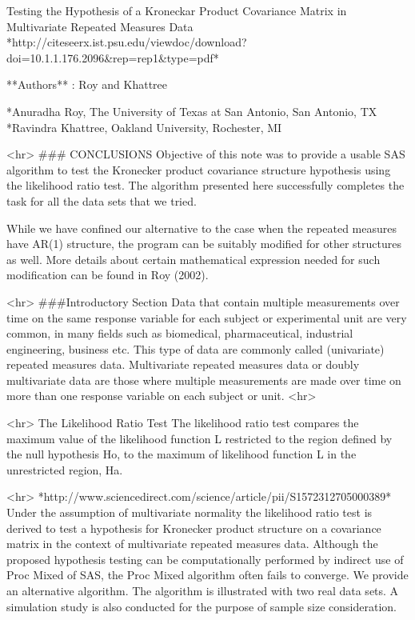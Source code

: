 Testing the Hypothesis of a Kroneckar Product Covariance Matrix in Multivariate Repeated Measures Data
*http://citeseerx.ist.psu.edu/viewdoc/download?doi=10.1.1.176.2096&rep=rep1&type=pdf*

**Authors** : Roy and Khattree

*Anuradha Roy, The University of Texas at San Antonio, San Antonio, TX  
*Ravindra Khattree, Oakland University, Rochester, MI  



<hr>
### CONCLUSIONS
Objective of this note was to provide a usable SAS algorithm to test the Kronecker product covariance
structure hypothesis using the likelihood ratio test. The algorithm presented here successfully completes
the task for all the data sets that we tried. 

While we have confined our alternative to the case when the repeated measures have AR(1) structure, the program can be suitably modified for other structures as well. More details about certain mathematical expression needed for such modification can be found in Roy (2002).

<hr>
###Introductory Section 
Data that contain multiple measurements over time on the same response variable for each subject
or experimental unit are very common, in many fields such as biomedical, pharmaceutical, industrial
engineering, business etc. This type of data are commonly called (univariate) repeated measures data.
Multivariate repeated measures data or doubly multivariate data are those where multiple measurements
are made over time on more than one response variable on each subject or unit.
<hr>

<hr>
The Likelihood Ratio Test
The likelihood ratio test compares the maximum value of the likelihood function L restricted to the
region defined by the null hypothesis Ho, to the maximum of likelihood function L in the unrestricted
region, Ha.

<hr>
*http://www.sciencedirect.com/science/article/pii/S1572312705000389*
Under the assumption of multivariate normality the likelihood ratio test is derived to test a hypothesis for Kronecker product structure on a covariance matrix in the context of multivariate repeated measures data. Although the proposed hypothesis testing can be computationally performed by indirect use of Proc Mixed of SAS, the Proc Mixed algorithm often fails to converge. We provide an alternative algorithm. The algorithm is illustrated with two real data sets. A simulation study is also conducted for the purpose of sample size consideration.
